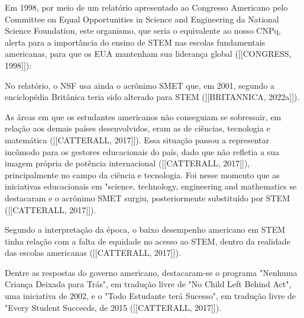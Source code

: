Em 1998, por meio de um relatório apresentado ao Congresso Americano pelo Committee on Equal Opportunities in Science and Engineering da National Science Foundation, este organismo, que seria o equivalente ao nosso CNPq, alerta para a importância do ensino de STEM nas escolas fundamentais americanas, para que os EUA mantenham sua liderança global  ([[CONGRESS, 1998]]):


\noindent\begin{center}\mbox{\centering{}}\end{center}


No relatório, o NSF usa ainda o acrônimo SMET que, em 2001, segundo a enciclopédia Britânica teria sido alterado para STEM ([[BRITANNICA, 2022a]]).

As áreas em que os estudantes americanos não conseguiam se sobressair, em relação aos demais países desenvolvidos, eram as de ciências, tecnologia e matemática  ([[CATTERALL, 2017]]). Essa situação passou a representar incômodo para os gestores educacionais do país, dado que não refletia a sua imagem própria de potência internacional  ([[CATTERALL, 2017]]), principalmente no campo da ciência e tecnologia. Foi nesse momento que as iniciativas educacionais em "science, technology, engineering and mathematics se destacaram e o acrônimo SMET surgiu, posteriormente substituído por STEM  ([[CATTERALL, 2017]]).

Segundo a interpretação da época, o baixo desempenho americano em STEM tinha relação com a falta de equidade no acesso ao STEM, dentro da realidade das escolas americanas  ([[CATTERALL, 2017]]).

Dentre as respostas do governo americano, destacaram-se o programa "Nenhuma Criança Deixada para Trás", em tradução livre de "No Child Left Behind Act", uma iniciativa de 2002, e o "Todo Estudante terá Sucesso", em tradução livre de "Every Student Succeeds, de 2015  ([[CATTERALL, 2017]]).

